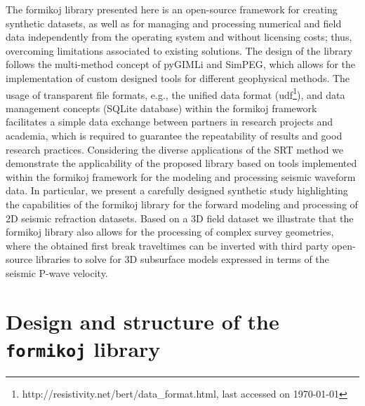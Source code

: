 \documentclass[a4paper,fleqn]{cas-sc}
\begin{document}
The formikoj library presented here is an open-source framework for creating synthetic datasets, as well as for managing and processing numerical and field data independently from the operating system and without licensing costs; thus, overcoming limitations associated to existing solutions. The design of the library follows the multi-method concept of pyGIMLi and SimPEG, which allows for the implementation of custom designed tools for different geophysical methods. 
The usage of transparent file formats, e.g., the unified data format (udf\footnote{http://resistivity.net/bert/data\_format.html, last accessed on \today}), and data management concepts (SQLite database) within the formikoj framework facilitates a simple data exchange between partners in research projects and academia, which is required to guarantee the repeatability of results and good research practices.
Considering the diverse applications of the SRT method we demonstrate the applicability of the proposed library based on tools implemented within the formikoj framework for the modeling and processing seismic waveform data. In particular, we present a carefully designed synthetic study highlighting the capabilities of the formikoj library for the forward modeling and processing of 2D seismic refraction datasets. Based on a 3D field dataset we illustrate that the formikoj library also allows for the processing of complex survey geometries, where the obtained first break traveltimes can be inverted with third party open-source libraries to solve for 3D subsurface models expressed in terms of the seismic P-wave velocity.

\section{Design and structure of the \texttt{formikoj} library}
\end{document}
